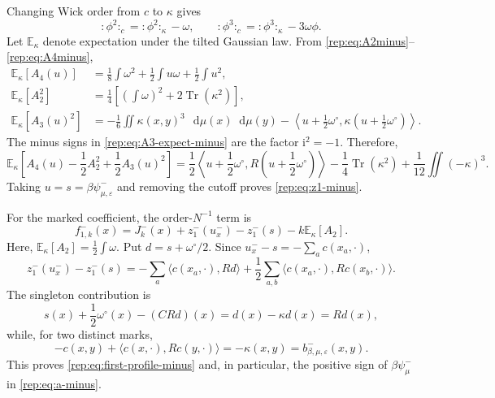 \documentclass[11pt,reqno]{amsart}
\numberwithin{equation}{section}
\theoremstyle{plain}
\theoremstyle{definition}
\newcommand{\dd}{\mathop{}\!\mathrm d}
\newcommand{\E}{\mathbb E}
\newcommand{\Tr}{\operatorname{Tr}}
\newcommand{\be}{\beta}
\newcommand{\vep}{\varepsilon}
\begin{document}
Changing Wick order from $c$ to $\kappa$ gives
\begin{equation}\label{rep:eq:wick-change-minus}
 :\!\phi^2\!:_c=:\!\phi^2\!:_\kappa-\omega,
 \qquad
 :\!\phi^3\!:_c=:\!\phi^3\!:_\kappa-3\omega\phi.
\end{equation}
Let $\E_\kappa$ denote expectation under the tilted Gaussian law. From \eqref{rep:eq:A2minus}--\eqref{rep:eq:A4minus},
\begin{align}
 \E_\kappa[A_4(u)]
 &=\frac18\int\omega^2+\frac12\int u\omega+\frac12\int u^2,\label{rep:eq:A4-expect-minus}\\
 \E_\kappa[A_2^2]
 &=\frac14\left[\left(\int\omega\right)^2+2\Tr(\kappa^2)\right],\label{rep:eq:A2-expect-minus}\\
 \E_\kappa[A_3(u)^2]
 &=-\frac16\iint\kappa(x,y)^3\,\dd\mu(x)\dd\mu(y)
 -\left\langle u+\frac12\omega^\circ,
 \kappa\left(u+\frac12\omega^\circ\right)\right\rangle.\label{rep:eq:A3-expect-minus}
\end{align}
The minus signs in \eqref{rep:eq:A3-expect-minus} are the factor $\mathrm{i}^2=-1$. Therefore,
\begin{equation}\label{rep:eq:z1-source-minus}
 \E_\kappa\left[A_4(u)-\frac12A_2^2+\frac12A_3(u)^2\right]
 =\frac12\left\langle u+\frac12\omega^\circ,
 R\left(u+\frac12\omega^\circ\right)\right\rangle
 -\frac14\Tr(\kappa^2)+\frac1{12}\iint(-\kappa)^3.
\end{equation}
Taking $u=s=\be\psi^-_{\mu,\vep}$ and removing the cutoff proves \eqref{rep:eq:z1-minus}.

For the marked coefficient, the order-$N^{-1}$ term is
\begin{equation}\label{rep:eq:profile-before-simplify}
 f^-_{1,k}(x)
 =J_k^-(x)+z^-_1(u_x^-)-z^-_1(s)-k\E_\kappa[A_2].
\end{equation}
Here, $\E_\kappa[A_2]=\frac12\int\omega$. Put $d=s+\omega^\circ/2$. Since $u_x^--s=-\sum_ac(x_a,\cdot)$,
\begin{equation}\label{rep:eq:z-difference-minus}
 z^-_1(u_x^-)-z^-_1(s)
 =-\sum_a\langle c(x_a,\cdot),Rd\rangle
 +\frac12\sum_{a,b}\langle c(x_a,\cdot),Rc(x_b,\cdot)\rangle.
\end{equation}
The singleton contribution is
\begin{equation}\label{rep:eq:singleton-simplify}
 s(x)+\frac12\omega^\circ(x)-(CRd)(x)
 =d(x)-\kappa d(x)=Rd(x),
\end{equation}
while, for two distinct marks,
\begin{equation}\label{rep:eq:pair-simplify}
 -c(x,y)+\langle c(x,\cdot),Rc(y,\cdot)\rangle
 =-\kappa(x,y)=b^-_{\be,\mu,\vep}(x,y).
\end{equation}
This proves \eqref{rep:eq:first-profile-minus} and, in particular, the positive sign of $\be\psi^-_\mu$ in \eqref{rep:eq:a-minus}.
\end{document}
